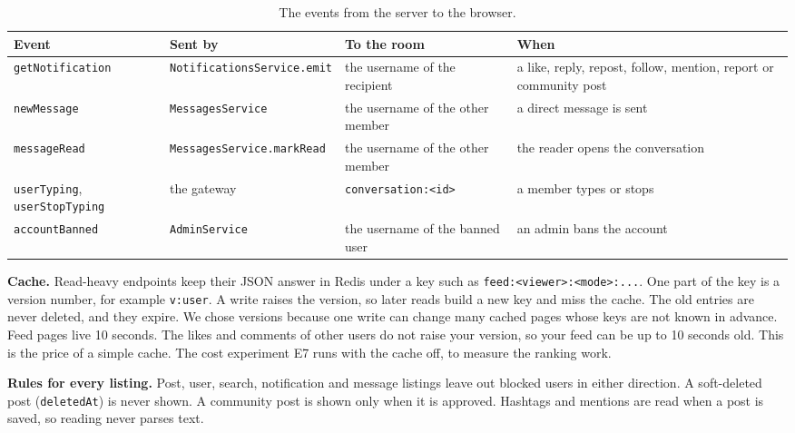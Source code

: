 \begin{table}[htbp]
  \centering
  \caption{The events from the server to the browser.}
  \label{tab:design-events}
  \small
  \begin{tabularx}{\textwidth}{@{}>{\raggedright\arraybackslash}p{3.1cm} >{\raggedright\arraybackslash}p{3.7cm} >{\raggedright\arraybackslash}X >{\raggedright\arraybackslash}X@{}}
    \toprule
    Event & Sent by & To the room & When \\
    \midrule
    \texttt{getNotification} & \texttt{Notifications\allowbreak Service.\allowbreak emit} & the username of the recipient & a like, reply, repost, follow, mention, report or community post \\
    \texttt{newMessage} & \texttt{MessagesService} & the username of the other member & a direct message is sent \\
    \texttt{messageRead} & \texttt{Messages\allowbreak Service.\allowbreak markRead} & the username of the other member & the reader opens the conversation \\
    \texttt{userTyping}, \texttt{userStopTyping} & the gateway & \texttt{conversation:\allowbreak <id>} & a member types or stops \\
    \texttt{accountBanned} & \texttt{AdminService} & the username of the banned user & an admin bans the account \\
    \bottomrule
  \end{tabularx}
\end{table}

\textbf{Cache.} Read-heavy endpoints keep their JSON answer in Redis under a key such as \texttt{feed:<viewer>:<mode>:...}. One part of the key is a version number, for example \texttt{v:user}. A write raises the version, so later reads build a new key and miss the cache. The old entries are never deleted, and they expire. We chose versions because one write can change many cached pages whose keys are not known in advance. Feed pages live 10 seconds. The likes and comments of other users do not raise your version, so your feed can be up to 10 seconds old. This is the price of a simple cache. The cost experiment E7 runs with the cache off, to measure the ranking work.

\textbf{Rules for every listing.} Post, user, search, notification and message listings leave out blocked users in either direction. A soft-deleted post (\texttt{deletedAt}) is never shown. A community post is shown only when it is approved. Hashtags and mentions are read when a post is saved, so reading never parses text.

